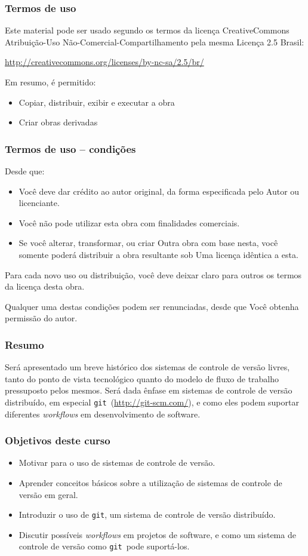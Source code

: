 \documentclass{beamer}
\newcommand{\git}{\texttt{git}}
\begin{document}
\begin{frame}
  \frametitle{Termos de uso}
  Este material pode ser usado segundo os termos da licença CreativeCommons
  Atribuição-Uso Não-Comercial-Compartilhamento pela mesma Licença 2.5 Brasil:

  \url{http://creativecommons.org/licenses/by-nc-sa/2.5/br/}

  Em resumo, é permitido:
  \begin{itemize}
    \item Copiar, distribuir, exibir e executar a obra
    \item Criar obras derivadas
  \end{itemize}
\end{frame}
\begin{frame}
  \frametitle{Termos de uso -- condições}
  Desde que:
  \begin{itemize}
    \item {} Você deve dar crédito ao autor
      original, da forma especificada pelo Autor ou licenciante.
    \item {} Você não pode utilizar esta
      obra com finalidades comerciais.
    \item {} Se você
      alterar, transformar, ou criar Outra obra com base nesta, você
      somente poderá distribuir a obra resultante sob Uma licença
      idêntica a esta.
  \end{itemize}

  Para cada novo uso ou distribuição, você deve deixar claro para outros os
  termos da licença desta obra.

  Qualquer uma destas condições podem ser renunciadas, desde que Você obtenha
  permissão do autor.
\end{frame}

\begin{frame}
  \frametitle{Resumo}

  Será apresentado um breve histórico dos sistemas de controle de
  versão livres, tanto do ponto de vista tecnológico quanto do modelo
  de fluxo de trabalho pressuposto pelos mesmos. Será dada ênfase em
  sistemas de controle de versão distribuído, em especial \git\
  (\url{http://git-scm.com/}), e como eles podem suportar diferentes
  \emph{workflows} em desenvolvimento de software.
\end{frame}

\begin{frame}
  \frametitle{Objetivos deste curso}
  \begin{itemize}
    \item Motivar para o uso de sistemas de controle de versão.
    \item Aprender conceitos básicos sobre a utilização de sistemas de
      controle de versão em geral.
    \item Introduzir o uso de \git, um sistema de controle de versão
      distribuído.
    \item Discutir possíveis \emph{workflows} em projetos de software, e
      como um sistema de controle de versão como \git\ pode suportá-los.
  \end{itemize}
\end{frame}
\end{document}
